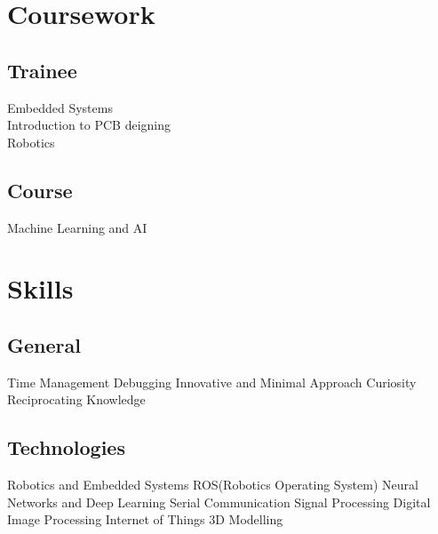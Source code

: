\documentclass[]{deedy-resume-openfont}
\begin{document}
\begin{minipage}[t]{0.33\textwidth}
\section{Coursework}


\subsection{Trainee}
\textbullet{}
Embedded Systems\\
\textbullet{}
Introduction to PCB deigning\\
\textbullet{}
Robotics
\sectionsep

\subsection{Course}
\textbullet{}
Machine Learning and AI
\sectionsep

\hline
\section{Skills}
\subsection{General}
Time Management\textbullet{}
Debugging\textbullet{}
Innovative and Minimal Approach\textbullet{}
Curiosity\textbullet{}
Reciprocating Knowledge
\sectionsep

\subsection{Technologies}
Robotics and Embedded Systems\textbullet{} ROS(Robotics Operating System)\textbullet{} Neural Networks and Deep Learning\textbullet{} Serial Communication\textbullet{} Signal Processing\textbullet{} Digital Image Processing\textbullet{} Internet of Things\textbullet{} 3D Modelling

%
%

\end{minipage} 
\hfill\vline\hfill
\end{document}
